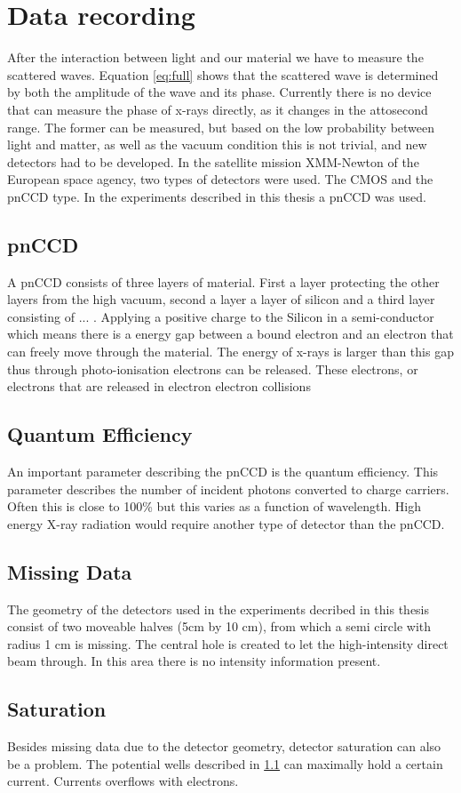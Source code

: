 \chapter{Data recording}
After the interaction between light and our material we have to
measure the scattered waves. Equation \ref{eq:full} shows that the
scattered wave is determined by both the amplitude of the wave and
its phase. Currently there is no device that can measure the phase of
x-rays directly, as it changes in the attosecond range. The former can be measured, but based on the low
probability between light and matter, as well as
the vacuum condition this is not trivial, and new detectors had to be
developed. In the satellite mission XMM-Newton of the European space
agency, two types of detectors were used. The CMOS and the pnCCD
type. In the experiments described in this thesis a pnCCD was used. 
\section{pnCCD}\label{sec:pnccd}
A pnCCD consists of three layers of material. First a layer
protecting the other layers from the high vacuum, second a layer
a layer of silicon and a third layer consisting of ... . Applying a
positive charge to the 
Silicon in a semi-conductor which means there is a energy gap between
a bound electron and an electron that can freely move through the material. The energy of x-rays is larger than this gap thus
through photo-ionisation electrons can be released. These electrons,
or electrons that are released in electron electron collisions
   
\section{Quantum Efficiency}
An important parameter describing the pnCCD is the quantum
efficiency. This parameter describes the number of incident photons
converted to charge carriers. Often this is close to 100\% but this
varies as a function of wavelength. High energy X-ray radiation would
require another type of detector than the pnCCD. 

\section{Missing Data}
The geometry of the detectors used in the experiments decribed in this
thesis consist of two moveable halves (5cm by 10 cm), from which a
semi circle with radius 1 cm is missing. The central
hole is created to let the high-intensity direct beam through. In this
area there is no intensity information present. 
 
\section{Saturation}
Besides missing data due to the detector geometry, detector saturation
can also be a problem. The potential wells described
in \ref{sec:pnccd} can maximally hold a certain current. Currents overflows with electrons.






